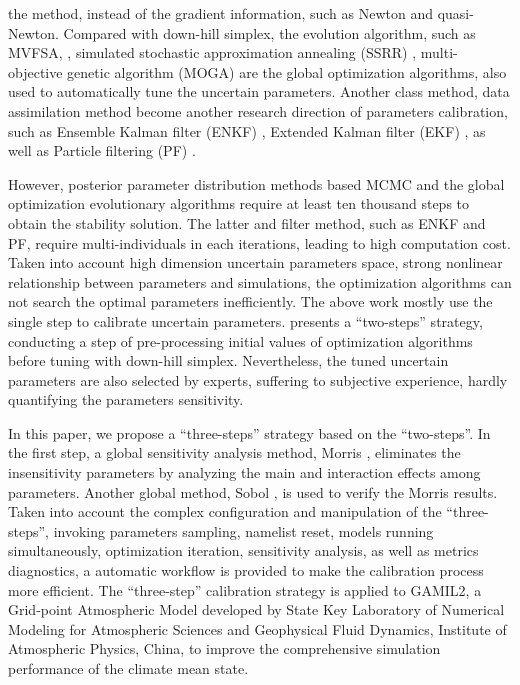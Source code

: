 \documentclass[gmd, manuscript]{copernicus}
\begin{document}
the method, instead of the gradient information, such as Newton and quasi-Newton.  Compared with 
down-hill simplex, the evolution algorithm,
such as MVFSA, \citep{jackson2004efficient,yang2014calibration}, simulated stochastic approximation
annealing (SSRR) \citep{yang2013uncertainty}, multi-objective genetic algorithm (MOGA)
\citep{swileruncertainty} are the global optimization algorithms, also used to automatically tune
the uncertain parameters. 
\cite{gill2006multiobjective}
Another class method, data assimilation method become another research
direction of parameters calibration, such as Ensemble Kalman filter (ENKF)
\citep{aksoy2006ensemble,delsole2010state}, Extended Kalman filter (EKF) \citep{carrassi2011state},
as well as Particle filtering (PF) \citep{snyder2008obstacles}.

However, posterior parameter distribution methods based MCMC and the global optimization
evolutionary algorithms require at least ten thousand steps to obtain the stability solution. The
latter and filter method, such as ENKF and PF, require multi-individuals in each iterations,
leading to high computation cost. Taken into account high dimension uncertain parameters space,
strong nonlinear relationship between parameters and simulations, the optimization algorithms can
not search the optimal parameters inefficiently. The above work mostly use the single step to
calibrate uncertain parameters. \cite{zhang2014quantification} presents a ``two-steps'' strategy,
conducting a step of pre-processing initial values of optimization algorithms before tuning with
down-hill simplex. Nevertheless, the tuned uncertain parameters are also selected by experts,
suffering to subjective experience, hardly quantifying the parameters sensitivity.

In this paper, we propose a ``three-steps'' strategy based on the ``two-steps''. In the first step,
a global sensitivity analysis method, Morris \citep{morris1991factorial,campolongo2007effective},
eliminates the insensitivity parameters by analyzing  the main and interaction effects among
parameters. Another global method, Sobol \citep{sobol2001global}, is used to verify the Morris
results. Taken into account the complex configuration and manipulation of the ``three-steps'',
invoking parameters sampling, namelist reset, models running simultaneously, optimization
iteration, sensitivity analysis, as well as metrics diagnostics, a automatic workflow is provided
to make the calibration process more efficient. The ``three-step'' calibration strategy is applied
to GAMIL2,  a Grid-point Atmospheric Model developed by State Key Laboratory of Numerical Modeling
for Atmospheric Sciences and Geophysical Fluid Dynamics, Institute of Atmospheric Physics, China,
to improve the comprehensive simulation performance of the climate mean state.
\end{document}
